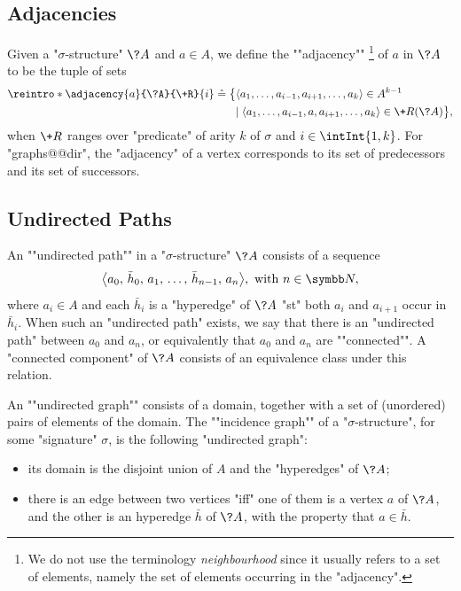 \subsection{Adjacencies}

Given a "$\sigma$-structure" $\?A$ and $a \in A$, we define the \AP""adjacency""%
\footnote{We do not use the terminology \emph{neighbourhood} since it usually refers
to a set of elements, namely the set of elements occurring in the "adjacency".}
of $a$ in $\?A$ to be the tuple of sets%
\AP{}
\begin{align*}
	\reintro*\adjacency{a}{\?A}{\+R}{i} & \defeq
		\big\{
			\langle a_1, \dotsc, a_{i-1}, a_{i+1}, \dotsc, a_k \rangle \in A^{k-1}
			\\ & \hphantom{\defeq \big\{ }\mid
			\langle a_1, \dotsc, a_{i-1}, a, a_{i+1}, \dotsc, a_k \rangle \in \+R(\?A)
		\big\},
\end{align*}
when $\+R$ ranges over "predicate" of arity $k$ of $\sigma$ and $i \in \intInt{1,k}$. 
For "graphs@@dir", the "adjacency" of a vertex corresponds to its set of predecessors and
its set of successors.

\subsection{Undirected Paths}

An \AP""undirected path"" in a "$\sigma$-structure" $\?A$ consists of a sequence
\[\big\langle a_0,\, \bar h_0,\, a_1,\, \dotsc,\, \bar h_{n-1},\, a_n\big\rangle, \text{ with } n \in \N,\]
where $a_i \in A$ and each $\bar h_i$ is a "hyperedge" of $\?A$ "st" both
$a_i$ and $a_{i+1}$ occur in $\bar h_i$. When such an "undirected path" exists, we say that
there is an "undirected path" between $a_0$ and $a_n$, or equivalently
that $a_0$ and $a_n$ are \AP""connected"".%
A \AP"connected component" of $\?A$ consists of an equivalence class under this relation.

An ""undirected graph"" consists of a domain, together with
a set of (unordered) pairs of elements of the domain.
The ""incidence graph"" of a "$\sigma$-structure",
for some "signature" $\sigma$, is the following "undirected graph":
\begin{itemize}
	\item its domain is the disjoint union of $A$
		and the "hyperedges" of $\?A$;
	\item there is an edge between two vertices "iff" one of them
		is a vertex $a$ of $\?A$, and the other is an hyperedge
		$\bar h$ of $\?A$, with the property that $a \in \bar h$.
\end{itemize}


